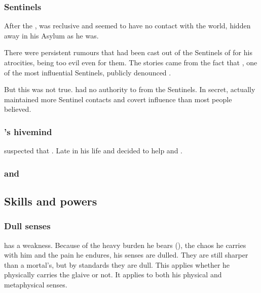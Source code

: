 \subsubsection{Sentinels}
After the \SecondShrouding, \Ishnaruchaefir{} was reclusive and seemed to have no contact with the world, hidden away in his Asylum as he was. 

There were persistent rumours that \Ishnaruchaefir{} had been cast out of the Sentinels of \Miith{} for his atrocities, being too evil even for them. 
The stories came from the fact that \Secherdamon, one of the most influential Sentinels, publicly denounced \Ishnaruchaefir. 

But this was not true. 
\Secherdamon{} had no authority to  \Ishnaruchaefir{} from the Sentinels. 
In secret, \Ishnaruchaefir{} actually maintained more Sentinel contacts and covert influence than most people believed. 





\subsubsection{\Tiamat's hivemind}
\Iscrafel suspected that . 
Late in his life  and decided to help \Tiamat and \Secherdamon. 





\subsubsection{\Zaz and \Urzaz}










\subsection{Skills and powers}





\subsubsection{Dull senses}
\Ishnaruchaefir{} has a weakness. 
Because of the heavy burden he bears (\Rystessakhin), the chaos he carries with him and the pain he endures, his senses are dulled. 
They are still sharper than a mortal's, but by \draconic{} standards they are dull. 
This applies whether he physically carries the glaive or not. 
It applies to both his physical and metaphysical senses. 

